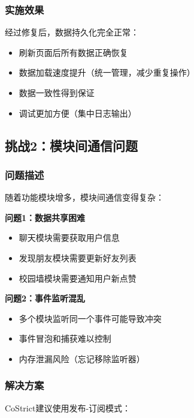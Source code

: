 \documentclass[12pt,a4paper]{article}
\begin{document}
\subsubsection{实施效果}

经过修复后，数据持久化完全正常：

\begin{itemize}
    \item 刷新页面后所有数据正确恢复
    \item 数据加载速度提升（统一管理，减少重复操作）
    \item 数据一致性得到保证
    \item 调试更加方便（集中日志输出）
\end{itemize}

\subsection{挑战2：模块间通信问题}

\subsubsection{问题描述}

随着功能模块增多，模块间通信变得复杂：

\textbf{问题1：数据共享困难}
\begin{itemize}
    \item 聊天模块需要获取用户信息
    \item 发现朋友模块需要更新好友列表
    \item 校园墙模块需要通知用户新点赞
\end{itemize}

\textbf{问题2：事件监听混乱}
\begin{itemize}
    \item 多个模块监听同一个事件可能导致冲突
    \item 事件冒泡和捕获难以控制
    \item 内存泄漏风险（忘记移除监听器）
\end{itemize}

\subsubsection{解决方案}

CoStrict建议使用发布-订阅模式：
\end{document}

